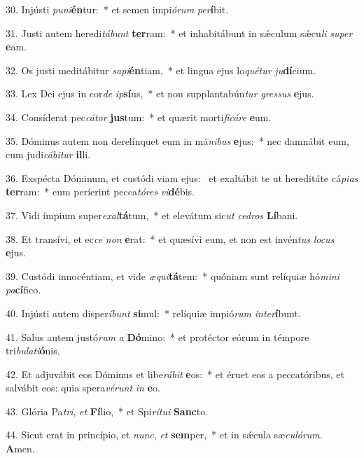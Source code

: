 30. Injústi \textit{pu}\textit{ni}\textbf{én}tur:~*  et semen impi\textit{ó}\textit{rum} \textit{per}\textbf{í}bit.\

31. Justi autem heredi\textit{tá}\textit{bunt} \textbf{ter}ram:~*  et inhabitábunt in sǽculum sǽcu\textit{li} \textit{su}\textit{per} \textbf{e}am.\

32. Os justi meditábitur \textit{sa}\textit{pi}\textbf{én}tiam,~*  et lingua ejus lo\textit{qué}\textit{tur} \textit{ju}\textbf{dí}cium.\

33. Lex Dei ejus in cor\textit{de} \textit{ip}\textbf{sí}us,~*  et non supplantabún\textit{tur} \textit{gres}\textit{sus} \textbf{e}jus.\

34. Consíderat pec\textit{cá}\textit{tor} \textbf{jus}tum:~*  et quærit morti\textit{fi}\textit{cá}\textit{re} \textbf{e}um.\

35. Dóminus autem non derelínquet eum in má\textit{ni}\textit{bus} \textbf{e}jus:~*  nec damnábit eum, cum judi\textit{cá}\textit{bi}\textit{tur} \textbf{il}li.\

36. Exspécta Dóminum, et custódi viam ejus: \dag\  et exaltábit te ut hereditáte cá\textit{pi}\textit{as} \textbf{ter}ram:~*  cum períerint pecca\textit{tó}\textit{res} \textit{vi}\textbf{dé}bis.\

37. Vidi ímpium super\textit{ex}\textit{al}\textbf{tá}tum,~*  et elevátum sic\textit{ut} \textit{ce}\textit{dros} \textbf{Lí}bani.\

38. Et transívi, et ec\textit{ce} \textit{non} \textbf{e}rat:~*  et quæsívi eum, et non est invén\textit{tus} \textit{lo}\textit{cus} \textbf{e}jus.\

39. Custódi innocéntiam, et vide \textit{æ}\textit{qui}\textbf{tá}tem:~*  quóniam sunt relíquiæ hó\textit{mi}\textit{ni} \textit{pa}\textbf{cí}fico.\

40. Injústi autem disper\textit{í}\textit{bunt} \textbf{si}mul:~*  relíquiæ impió\textit{rum} \textit{in}\textit{ter}\textbf{í}bunt.\

41. Salus autem justó\textit{rum} \textit{a} \textbf{Dó}mino:~*  et protéctor eórum in témpore tri\textit{bu}\textit{la}\textit{ti}\textbf{ó}nis.\

42. Et adjuvábit eos Dóminus et libe\textit{rá}\textit{bit} \textbf{e}os:~*  et éruet eos a peccatóribus, et salvábit eos: quia spera\textit{vé}\textit{runt} \textit{in} \textbf{e}o.\

43. Glória Pa\textit{tri}, \textit{et} \textbf{Fí}lio,~*  et Spi\textit{rí}\textit{tu}\textit{i} \textbf{Sanc}to.\

44. Sicut erat in princípio, et \textit{nunc}, \textit{et} \textbf{sem}per,~*  et in sǽcula sæ\textit{cu}\textit{ló}\textit{rum}. \textbf{A}men.\

